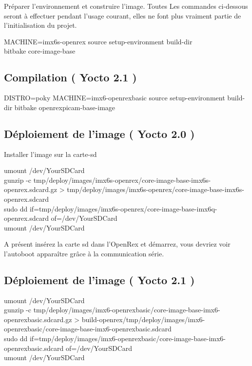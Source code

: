 Préparer l’environnement et construire l’image. Toutes Les commandes ci-dessous seront à effectuer pendant l’usage courant, elles ne font plus vraiment partie de l’initialisation du projet.


\begin{tcolorbox}
	MACHINE=imx6s-openrex source setup-environment build-dir \\
	bitbake core-image-base
\end{tcolorbox}

\subsection{Compilation ( Yocto 2.1 )}

\begin{tcolorbox}DISTRO=poky MACHINE=imx6-openrexbasic source setup-environment build-dir
	bitbake openrexpicam-base-image
\end{tcolorbox}

\subsection{Déploiement de l’image ( Yocto 2.0 )}

Installer l’image sur la carte-sd

\begin{tcolorbox}
	umount /dev/YourSDCard \\
	gunzip -c tmp/deploy/images/imx6s-openrex/core-image-base-imx6s-openrex.sdcard.gz > tmp/deploy/images/imx6s-openrex/core-image-base-imx6s-openrex.sdcard \\
	sudo dd if=tmp/deploy/images/imx6s-openrex/core-image-base-imx6q-openrex.sdcard of=/dev/YourSDCard \\
	umount /dev/YourSDCard \\
\end{tcolorbox}

A présent insérez la carte sd dans l’OpenRex et démarrez, vous devriez voir l’autoboot apparaître grâce à la communication série.

\subsection{Déploiement de l’image ( Yocto 2.1 )}

\begin{tcolorbox}
	umount /dev/YourSDCard \\
	gunzip -c tmp/deploy/images/imx6-openrexbasic/core-image-base-imx6-openrexbasic.sdcard.gz > build-openrex/tmp/deploy/images/imx6-openrexbasic/core-image-base-imx6-openrexbasic.sdcard \\
	sudo dd if=tmp/deploy/images/imx6-openrexbasic/core-image-base-imx6-openrexbasic.sdcard of=/dev/YourSDCard \\
	umount /dev/YourSDCard \\
\end{tcolorbox}

